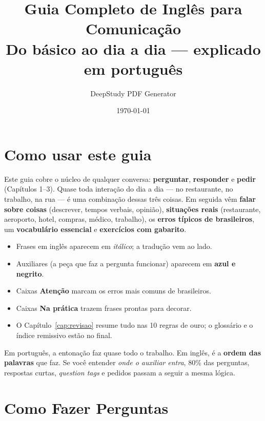 \documentclass[12pt,a4paper,oneside]{book}
\title{Guia Completo de Inglês para Comunicação\\[0.4em]\Large Do básico ao dia a dia --- explicado em português}
\author{DeepStudy PDF Generator}
\date{\today}
\newcommand{\en}[1]{\textit{#1}}                 %
\newcommand{\aux}[1]{\textbf{\textcolor{blue!60!black}{#1}}} %
\begin{document}
\maketitle
\tableofcontents

\chapter*{Como usar este guia}

Este guia cobre o núcleo de qualquer conversa: \textbf{perguntar}, \textbf{responder} e \textbf{pedir} (Capítulos 1--3). Quase toda interação do dia a dia --- no restaurante, no trabalho, na rua --- é uma combinação dessas três coisas. Em seguida vêm \textbf{falar sobre coisas} (descrever, tempos verbais, opinião), \textbf{situações reais} (restaurante, aeroporto, hotel, compras, médico, trabalho), os \textbf{erros típicos de brasileiros}, um \textbf{vocabulário essencial} e \textbf{exercícios com gabarito}.

\begin{itemize}
  \item Frases em inglês aparecem em \en{itálico}; a tradução vem ao lado.
  \item Auxiliares (a peça que faz a pergunta funcionar) aparecem em \aux{azul e negrito}.
  \item Caixas \textbf{Atenção} marcam os erros mais comuns de brasileiros.
  \item Caixas \textbf{Na prática} trazem frases prontas para decorar.
  \item O Capítulo~\ref{cap:revisao} resume tudo nas 10 regras de ouro; o glossário e o índice remissivo estão no final.
\end{itemize}

\begin{nota}
Em português, a entonação faz quase todo o trabalho. Em inglês, é a \textbf{ordem das palavras} que faz. Se você entender \emph{onde o auxiliar entra}, 80\% das perguntas, respostas curtas, \emph{question tags} e pedidos passam a seguir a mesma lógica.
\end{nota}

\chapter{Como Fazer Perguntas}
\label{cap:perguntas}
\end{document}
